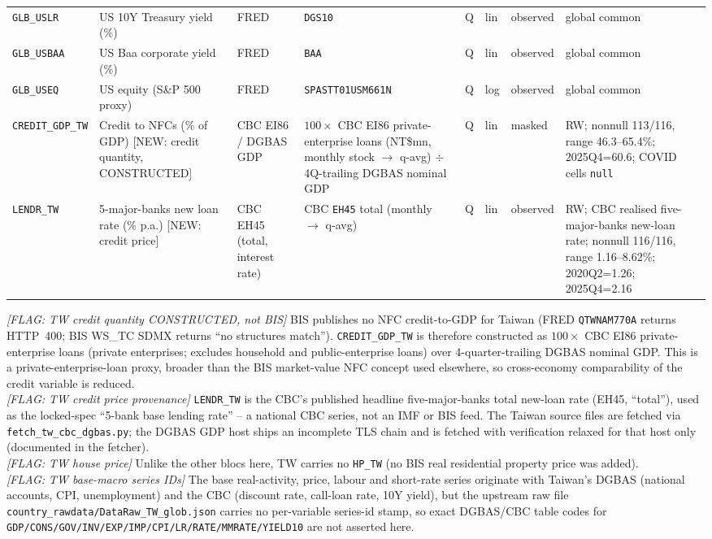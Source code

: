{\begin{longtable}{p{2.3cm}p{3.3cm}p{2.1cm}p{2.2cm}p{0.6cm}p{1.4cm}p{1.9cm}p{2.4cm}}
\texttt{GLB\_USLR}  & US 10Y Treasury yield (\%)         & FRED & \texttt{DGS10} & Q & lin & observed & global common \\
\texttt{GLB\_USBAA} & US Baa corporate yield (\%)        & FRED & \texttt{BAA} & Q & lin & observed & global common \\
\texttt{GLB\_USEQ}  & US equity (S\&P 500 proxy)         & FRED & \texttt{SPASTT01USM661N} & Q & log & observed & global common \\
\texttt{CREDIT\_GDP\_TW} & Credit to NFCs (\% of GDP) [NEW: credit quantity, CONSTRUCTED] & CBC EI86 / DGBAS GDP & $100\times$ CBC EI86 private-enterprise loans (NT\$mn, monthly stock $\to$ q-avg) $\div$ 4Q-trailing DGBAS nominal GDP & Q & lin & masked & RW; nonnull 113/116, range 46.3--65.4\%; 2025Q4=60.6; COVID cells \texttt{null} \\
\texttt{LENDR\_TW}  & 5-major-banks new loan rate (\% p.a.) [NEW: credit price] & CBC EH45 (total, interest rate) & CBC \texttt{EH45} total (monthly $\to$ q-avg) & Q & lin & observed & RW; CBC realised five-major-banks new-loan rate; nonnull 116/116, range 1.16--8.62\%; 2020Q2=1.26; 2025Q4=2.16 \\
\end{longtable}}

\noindent\textit{[FLAG: TW credit quantity CONSTRUCTED, not BIS]} BIS publishes
no NFC credit-to-GDP for Taiwan (FRED \texttt{QTWNAM770A} returns HTTP~400; BIS
WS\_TC SDMX returns ``no structures match''). \texttt{CREDIT\_GDP\_TW} is
therefore constructed as $100\times$ CBC EI86 private-enterprise loans
(private enterprises; excludes household and public-enterprise loans) over 4-quarter-trailing
DGBAS nominal GDP. This is a private-enterprise-loan proxy, broader than the
BIS market-value NFC concept used elsewhere, so cross-economy comparability of
the credit variable is reduced.\\
\textit{[FLAG: TW credit price provenance]} \texttt{LENDR\_TW} is the CBC's
published headline five-major-banks total new-loan rate (EH45, ``total''), used as the
locked-spec ``5-bank base lending rate'' -- a national CBC series, not an IMF or
BIS feed. The Taiwan source files are fetched via
\texttt{fetch\_tw\_cbc\_dgbas.py}; the DGBAS GDP host ships an incomplete TLS
chain and is fetched with verification relaxed for that host only (documented in
the fetcher).\\
\textit{[FLAG: TW house price]} Unlike the other blocs here, TW carries no
\texttt{HP\_TW} (no BIS real residential property price was added).\\
\textit{[FLAG: TW base-macro series IDs]} The base real-activity, price, labour
and short-rate series originate with Taiwan's DGBAS (national accounts, CPI,
unemployment) and the CBC (discount rate, call-loan rate, 10Y yield), but the
upstream raw file \texttt{country\_rawdata/DataRaw\_TW\_glob.json} carries no
per-variable series-id stamp, so exact DGBAS/CBC table codes for
\texttt{GDP/\allowbreak CONS/\allowbreak GOV/\allowbreak INV/\allowbreak EXP/\allowbreak IMP/\allowbreak CPI/\allowbreak LR/\allowbreak RATE/\allowbreak MMRATE/\allowbreak YIELD10} are not asserted
here.
